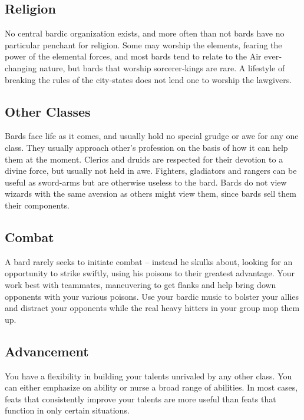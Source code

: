 \subsection{Religion}

No central bardic organization exists, and more often than not bards have no particular penchant for religion. Some may worship the elements, fearing the power of the elemental forces, and most bards tend to relate to the Air ever‐changing nature, but bards that worship sorcerer‐kings are rare. A lifestyle of breaking the rules of the city‐states does not lend one to worship the lawgivers.

\subsection{Other Classes}

Bards face life as it comes, and usually hold no special grudge or awe for any one class. They usually approach other's profession on the basis of how it can help them at the moment. Clerics and druids are respected for their devotion to a divine force, but usually not held in awe. Fighters, gladiators and rangers can be useful as sword-arms but are otherwise useless to the bard. Bards do not view wizards with the same aversion as others might view them, since bards sell them their components.

\subsection{Combat}

A bard rarely seeks to initiate combat -- instead he skulks about, looking for an opportunity to strike swiftly, using his poisons to their greatest advantage. Your work best with teammates, maneuvering to get flanks and help bring down opponents with your various poisons. Use your bardic music to bolster your allies and distract your opponents while the real heavy hitters in your group mop them up.

\subsection{Advancement}

You have a flexibility in building your talents unrivaled by any other class. You can either emphasize on ability or nurse a broad range of abilities. In most cases, feats that consistently improve your talents are more useful than feats that function in only certain situations.

